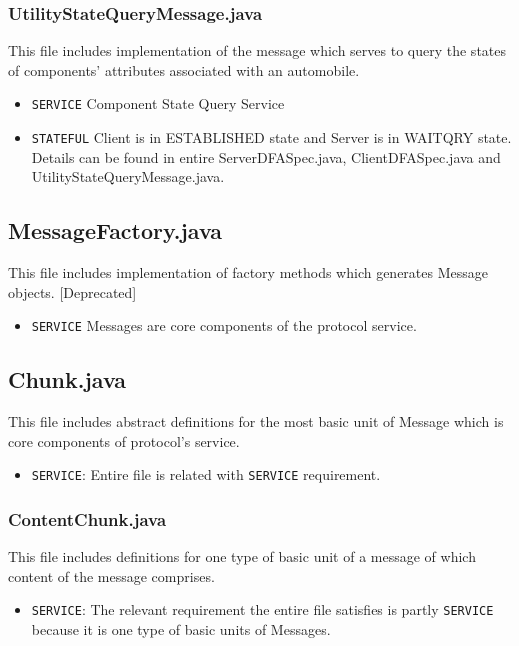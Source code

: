 \documentclass[12pt]{usenixsubmit}
\begin{document}
     \subsubsection{UtilityStateQueryMessage.java} This file includes implementation of the message which serves to query the states of components' attributes associated with an automobile.
     \begin{itemize}
     \item {\tt SERVICE}  Component State Query Service
     \item {\tt STATEFUL} Client is in ESTABLISHED state and Server is in WAITQRY state.  Details can be found in entire ServerDFASpec.java, ClientDFASpec.java and UtilityStateQueryMessage.java.
     \end{itemize} 
     
    \subsection{MessageFactory.java} This file includes implementation of factory methods which generates Message objects. [Deprecated]
     \begin{itemize}
     \item {\tt SERVICE}  Messages are core components of the protocol service. 
     \end{itemize}
     
     \subsection{Chunk.java} This file includes abstract definitions for the most basic unit of Message which is core components of protocol's service.
     \begin{itemize}
     \item {\tt SERVICE}: Entire file is related with {\tt SERVICE} requirement.
     \end{itemize}

    \subsubsection{ContentChunk.java}This file includes definitions for one type of basic unit of a message of which content of the message comprises.
    \begin{itemize}
     \item {\tt SERVICE}: The relevant requirement the entire file satisfies is partly {\tt SERVICE} because it is one type of basic units of Messages.
     \end{itemize}
\end{document}
